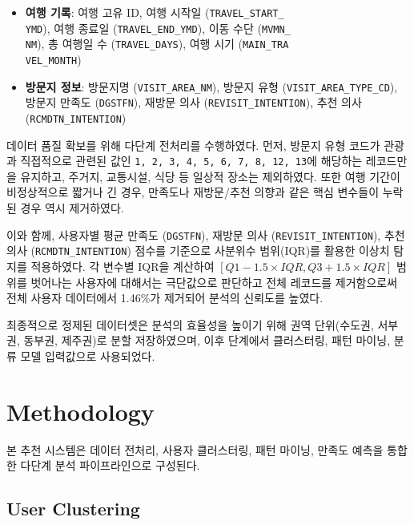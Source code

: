 \documentclass[sigconf]{acmart}
\begin{document}
\begin{CJK}{UTF8}{mj}
\begin{itemize}
  \item \textbf{여행 기록}: 여행 고유 ID, 여행 시작일 (\texttt{TRAVEL\_START\_\\YMD}), 여행 종료일 (\texttt{TRAVEL\_END\_YMD}), 이동 수단 (\texttt{MVMN\_\\NM}), 총 여행일 수 (\texttt{TRAVEL\_DAYS}), 여행 시기 (\texttt{MAIN\_TRA\\VEL\_MONTH})
  
  \item \textbf{방문지 정보}: 방문지명 (\texttt{VISIT\_AREA\_NM}), 방문지 유형 (\texttt{VISIT\_AREA\_TYPE\_CD}), 방문지 만족도 (\texttt{DGSTFN}), 재방문 의사 (\texttt{REVISIT\_INTENTION}), 추천 의사 (\texttt{RCMDTN\_INTENTION})
  
\end{itemize}

데이터 품질 확보를 위해 다단계 전처리를 수행하였다. 먼저, 방문지 유형 코드가 관광과 직접적으로 관련된 값인 \texttt{1, 2, 3, 4, 5, 6, 7, 8, 12, 13}에 해당하는 레코드만을 유지하고, 주거지, 교통시설, 식당 등 일상적 장소는 제외하였다. 또한 여행 기간이 비정상적으로 짧거나 긴 경우, 만족도나 재방문/추천 의향과 같은 핵심 변수들이 누락된 경우 역시 제거하였다.

이와 함께, 사용자별 평균 만족도 (\texttt{DGSTFN}), 재방문 의사 (\texttt{REVISIT\_INTENTION}), 추천 의사 (\texttt{RCMDTN\_INTENTION}) 점수를 기준으로 사분위수 범위(IQR)를 활용한 이상치 탐지를 적용하였다. 각 변수별 IQR을 계산하여 \([Q1 - 1.5 \times IQR, Q3 + 1.5 \times IQR]\) 범위를 벗어나는 사용자에 대해서는 극단값으로 판단하고 전체 레코드를 제거함으로써 전체 사용자 데이터에서 1.46\%가 제거되어 분석의 신뢰도를 높였다.

최종적으로 정제된 데이터셋은 분석의 효율성을 높이기 위해 권역 단위(수도권, 서부권, 동부권, 제주권)로 분할 저장하였으며, 이후 단계에서 클러스터링, 패턴 마이닝, 분류 모델 입력값으로 사용되었다.



\section{Methodology} %

본 추천 시스템은 데이터 전처리, 사용자 클러스터링, 패턴 마이닝, 만족도 예측을 통합한 다단계 분석 파이프라인으로 구성된다.

\subsection{User Clustering}


\end{CJK}
\end{document}
